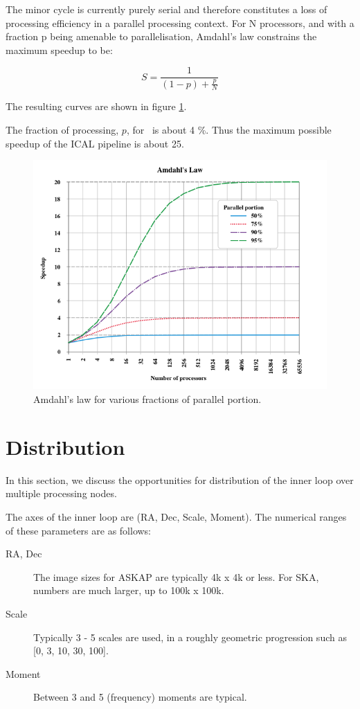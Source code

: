 \documentclass[11pt,a4paper,variablewidth]{article}
\begin{document}
The minor cycle is currently purely serial and therefore constitutes a loss of processing efficiency in a parallel processing context. For N processors, and with a fraction p being amenable to parallelisation, Amdahl's law constrains the maximum speedup to be:

\begin{equation}
S = \frac{1}{(1-p) + \frac{p}{N}}
\end{equation}

The resulting curves are shown in figure \ref{fig:amdahl}. 

The fraction of processing, $p$, for \MAM\ is about 4 \%. Thus the maximum possible speedup of the ICAL pipeline is about 25.
\begin{figure}[htb]
  \centering
  \includegraphics[width=\textwidth]{./pngs/AmdahlsLaw.png}
  \caption{Amdahl's law for various fractions of parallel portion.}
  \label{fig:amdahl}
\end{figure}

\clearpage

\pagebreak
\section{Distribution}
\label{sec:distribution}

In this section, we discuss the opportunities for distribution of the inner loop over multiple processing nodes.

The axes of the inner loop are (RA, Dec, Scale, Moment). The numerical ranges of these parameters are as follows:
\begin{description}
\item[RA, Dec] The image sizes for ASKAP are typically 4k x 4k or less. For SKA, numbers are much larger, up to 100k x 100k.
\item[Scale] Typically 3 - 5 scales are used, in a roughly geometric progression such as [0, 3, 10, 30, 100].
\item[Moment] Between 3 and 5 (frequency) moments are typical.
\end{description}
\end{document}
